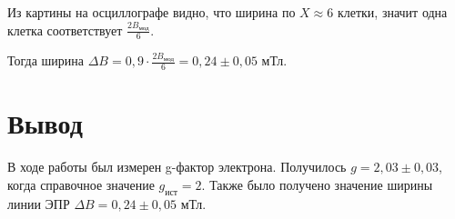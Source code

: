 \documentclass[a4paper,12pt]{article}
\begin{document}
Из картины на осциллографе видно, что ширина по $X \approx 6$ клетки, значит одна клетка соответствует $\frac{2 B_\text{мод}}{6}$.

Тогда ширина $\Delta B = 0,9 \cdot \frac{2 B_\text{мод}}{6} = 0,24 \pm 0,05$ мТл.

\section{Вывод}
В ходе работы был измерен g-фактор электрона. Получилось $g = 2,03 \pm 0,03$, когда справочное значение $g_\text{ист} = 2$. Также было получено значение ширины линии ЭПР $\Delta B = 0,24 \pm 0,05$ мТл.
\end{document}
